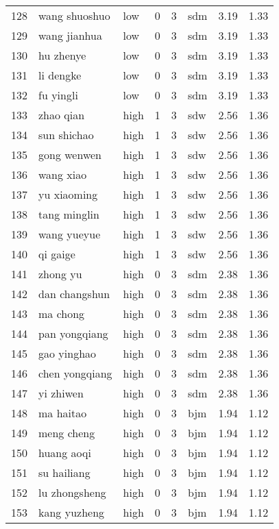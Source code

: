 \begin{table}[ht]
\begin{tabular}{rllrrlrr}
  128 & wang shuoshuo & low &   0 &   3 & sdm & 3.19 & 1.33 \\ 
  129 & wang jianhua & low &   0 &   3 & sdm & 3.19 & 1.33 \\ 
  130 & hu zhenye & low &   0 &   3 & sdm & 3.19 & 1.33 \\ 
  131 & li dengke & low &   0 &   3 & sdm & 3.19 & 1.33 \\ 
  132 & fu yingli & low &   0 &   3 & sdm & 3.19 & 1.33 \\ 
  133 & zhao qian & high &   1 &   3 & sdw & 2.56 & 1.36 \\ 
  134 & sun shichao & high &   1 &   3 & sdw & 2.56 & 1.36 \\ 
  135 & gong wenwen & high &   1 &   3 & sdw & 2.56 & 1.36 \\ 
  136 & wang xiao & high &   1 &   3 & sdw & 2.56 & 1.36 \\ 
  137 & yu xiaoming & high &   1 &   3 & sdw & 2.56 & 1.36 \\ 
  138 & tang minglin & high &   1 &   3 & sdw & 2.56 & 1.36 \\ 
  139 & wang yueyue & high &   1 &   3 & sdw & 2.56 & 1.36 \\ 
  140 & qi gaige & high &   1 &   3 & sdw & 2.56 & 1.36 \\ 
  141 & zhong yu & high &   0 &   3 & sdm & 2.38 & 1.36 \\ 
  142 & dan changshun & high &   0 &   3 & sdm & 2.38 & 1.36 \\ 
  143 & ma chong & high &   0 &   3 & sdm & 2.38 & 1.36 \\ 
  144 & pan yongqiang & high &   0 &   3 & sdm & 2.38 & 1.36 \\ 
  145 & gao yinghao & high &   0 &   3 & sdm & 2.38 & 1.36 \\ 
  146 & chen yongqiang & high &   0 &   3 & sdm & 2.38 & 1.36 \\ 
  147 & yi zhiwen & high &   0 &   3 & sdm & 2.38 & 1.36 \\ 
  148 & ma haitao & high &   0 &   3 & bjm & 1.94 & 1.12 \\ 
  149 & meng cheng & high &   0 &   3 & bjm & 1.94 & 1.12 \\ 
  150 & huang aoqi & high &   0 &   3 & bjm & 1.94 & 1.12 \\ 
  151 & su hailiang & high &   0 &   3 & bjm & 1.94 & 1.12 \\ 
  152 & lu zhongsheng & high &   0 &   3 & bjm & 1.94 & 1.12 \\ 
  153 & kang yuzheng & high &   0 &   3 & bjm & 1.94 & 1.12 \\ 

\end{tabular}
\end{table}
